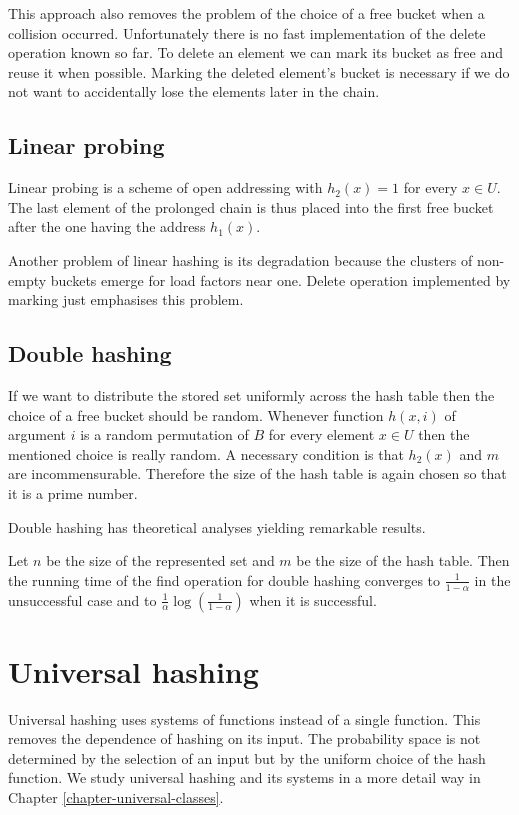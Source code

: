 This approach also removes the problem of the choice of a free bucket when a collision occurred. Unfortunately there is no fast implementation of the delete operation known so far. To delete an element we can mark its bucket as free and reuse it when possible. Marking the deleted element's bucket is necessary if we do not want to accidentally lose the elements later in the chain.

\subsection{Linear probing}
Linear probing is a scheme of open addressing with $h_2(x) = 1$ for every $x \in U$. The last element of the prolonged chain is thus placed into the first free bucket after the one having the address $h_1(x)$.

Another problem of linear hashing is its degradation because the clusters of non-empty buckets emerge for load factors near one. Delete operation implemented by marking just emphasises this problem.

\subsection{Double hashing}
If we want to distribute the stored set uniformly across the hash table then the choice of a free bucket should be random. Whenever function $h(x, i)$ of argument $i$ is a random permutation of $B$ for every element $x \in U$ then the mentioned choice is really random. A necessary condition is that $h_2(x)$ and $m$ are incommensurable. Therefore the size of the hash table is again chosen so that it is a prime number. 

Double hashing has theoretical analyses yielding remarkable results.
\begin{theorem}
Let $n$ be the size of the represented set and $m$ be the size of the hash table. Then the running time of the find operation for double hashing converges to $\frac{1}{1 - \alpha}$ in the unsuccessful case and to $\frac{1}{\alpha}\log\left(\frac{1}{1 - \alpha}\right)$ when it is successful.
\end{theorem}

\section{Universal hashing}
Universal hashing uses systems of functions instead of a single function. This removes the dependence of hashing on its input. The probability space is not determined by the selection of an input but by the uniform choice of the hash function. We study universal hashing and its systems in a more detail way in Chapter \ref{chapter-universal-classes}.

